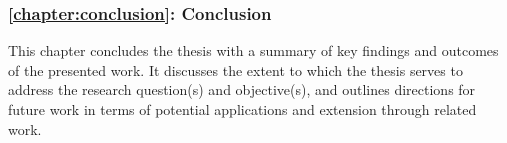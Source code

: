 \subsubsection{\autoref{chapter:conclusion}: Conclusion}
This chapter concludes the thesis with a summary of key findings and outcomes of the presented work. It discusses the extent to which the thesis serves to address the research question(s) and objective(s), and outlines directions for future work in terms of potential applications and extension through related work.
